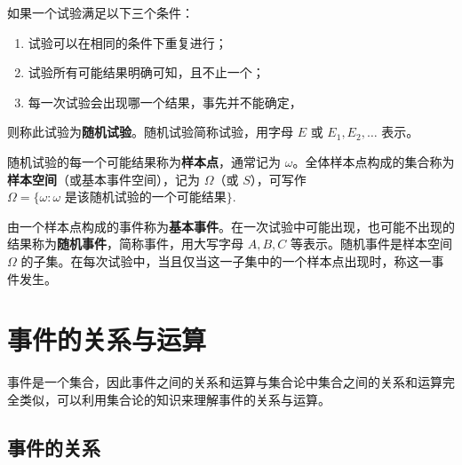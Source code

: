 \documentclass[lang=cn,11pt]{elegantbook}
\begin{document}
\begin{definition}[随机试验] \label{def:random-experiment}
如果一个试验满足以下三个条件：
\begin{enumerate}
    \item 试验可以在相同的条件下重复进行；
    \item 试验所有可能结果明确可知，且不止一个；
    \item 每一次试验会出现哪一个结果，事先并不能确定，
\end{enumerate}
则称此试验为\textbf{随机试验}。随机试验简称试验，用字母 \(E\) 或 \(E_1, E_2, \dots\) 表示。
\end{definition}

\begin{definition}[样本空间] \label{def:sample-space}
随机试验的每一个可能结果称为\textbf{样本点}，通常记为 \(\omega\)。全体样本点构成的集合称为\textbf{样本空间}（或基本事件空间），记为 \(\Omega\)（或 \(S\)），可写作
\(
\Omega=\{\omega:\omega \text{ 是该随机试验的一个可能结果}\}.
\)
\end{definition}

\begin{definition} \label{def:random-event}
由一个样本点构成的事件称为\textbf{基本事件}。在一次试验中可能出现，也可能不出现的结果称为\textbf{随机事件}，简称事件，用大写字母 \(A, B, C\) 等表示。随机事件是样本空间 \(\Omega\) 的子集。在每次试验中，当且仅当这一子集中的一个样本点出现时，称这一事件发生。
\end{definition}

\section{事件的关系与运算}

事件是一个集合，因此事件之间的关系和运算与集合论中集合之间的关系和运算完全类似，可以利用集合论的知识来理解事件的关系与运算。

\subsection{事件的关系}
\end{document}

